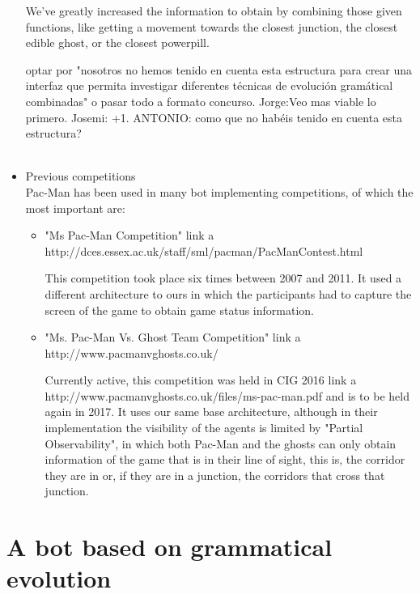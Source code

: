 \documentclass{llncs}
\newcommand{\paco}{Pac-Man }
\begin{document}
\begin{itemize}
We've greatly increased the information to obtain by combining those given functions, like getting a movement towards the closest junction, the closest edible ghost, or the closest powerpill.

{\color{red}optar por "nosotros no hemos tenido en cuenta esta estructura para crear una interfaz que permita investigar diferentes técnicas de evolución gramátical combinadas" o pasar todo a formato concurso. Jorge:Veo mas viable lo primero. Josemi: +1. ANTONIO: como que no habéis tenido en cuenta esta estructura?}
\\
\\

\item Previous competitions
\\

\paco has been used in many bot implementing competitions, of which the most important are:

\begin{itemize}
\setlength{\itemindent}{-.3cm}
\item "Ms Pac-Man Competition"{\color{red} link a http://dces.essex.ac.uk/staff/sml/pacman/PacManContest.html}

This competition took place six times between 2007 and 2011. It used a different architecture to ours in which the participants had to capture the screen of the game to obtain game status information. 
\item "Ms. Pac-Man Vs. Ghost Team Competition"{\color{red} link a http://www.pacmanvghosts.co.uk/}

Currently active, this competition was held in CIG 2016{\color{red} link a http://www.pacmanvghosts.co.uk/files/ms-pac-man.pdf} and is to be held again in 2017. It uses our same base architecture, although in their implementation the visibility of the agents is limited by "Partial Observability", in which both \paco and the ghosts can only obtain information of the game that is in their line of sight, this is, the corridor they are in or, if they are in a junction, the corridors that cross that junction.
\end{itemize}

 


\end{itemize}


%
\section{A bot based on grammatical evolution}
\label{sec:sec1}
%
\end{document}

